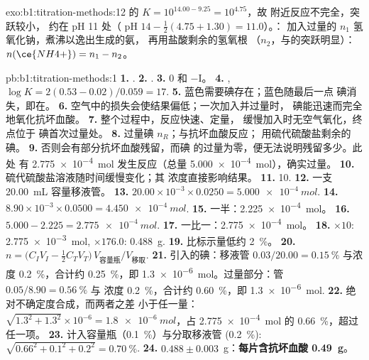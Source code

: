 \begin{solution}{exo:b1:titration-methods:12}
 的 $K = 10^{14.00 - 9.25} = 10^{4.75}$，故
附近反应不完全，突跃较小，
约在 pH 11 处（ pH $14 - \frac12(4.75 + 1.30) = 11.0$）。：
加入过量的 $n_1$ 氢氧化钠，煮沸以逸出生成的氨，
再用盐酸剩余的氢氧根
（$n_2$，与的突跃明显）：$n(\ce{NH4+}) = n_1 - n_2$。
\end{solution}

\begin{solution}{pb:b1:titration-methods:1}
\textbf{1.} .
\textbf{2.} .
\textbf{3.} 0 和 $-$I。
\textbf{4.} , $\log K = 2(0.53 - 0.02)/0.059
= 17$.
\textbf{5.} 蓝色需要碘存在；蓝色随最后一点
碘消失，即在。
\textbf{6.} 空气中的损失会使结果偏低；一次加入并过量时，
碘能迅速而完全地氧化抗坏血酸。
\textbf{7.} 整个过程中，反应快速、定量，
缓慢加入时无空气氧化，终点位于
碘首次过量处。
\textbf{8.} 过量碘 $n_R$；与抗坏血酸反应；
用硫代硫酸盐剩余的碘。
\textbf{9.} 否则会有部分抗坏血酸残留，而碘
的过量为零，便无法说明残留多少。此处
有 \qty{2.775e-4}{mol} 发生反应（总量 \qty{5.000e-4}{mol}），确实过量。
\textbf{10.} 硫代硫酸盐溶液随时间缓慢变化；其
浓度直接影响结果。
\textbf{11.} 10.
\textbf{12.} 一支 \qty{20.00}{mL} 容量移液管。
\textbf{13.} $20.00 \times 10^{-3} \times 0.0250 = \qty{5.000e-4}{mol}$.
\textbf{14.} $8.90 \times 10^{-3} \times 0.0500 = \qty{4.450e-4}{mol}$.
\textbf{15.} 一半：\qty{2.225e-4}{mol}。
\textbf{16.} $5.000 - 2.225 = \qty{2.775e-4}{mol}$.
\textbf{17.} 一比一：\qty{2.775e-4}{mol}。
\textbf{18.} $\times 10$: \qty{2.775e-3}{mol}, $\times 176.0$:
\qty{0.488}{g}.
\textbf{19.} 比标示量低约 \qty{2}{\percent}。
\textbf{20.} $n = \bigl(C_IV_I - \frac12C_TV_T\bigr)\,V_{\text{容量瓶}}/V_{\text{移取}}$.
\textbf{21.} 引入的碘：移液管 $0.03/20.00 = \qty{0.15}{\percent}$
与浓度 \qty{0.2}{\percent}，合计约 \qty{0.25}{\percent}，即
\qty{1.3e-6}{mol}。过量部分：管 $0.05/8.90 = \qty{0.56}{\percent}$ 与
浓度 \qty{0.2}{\percent}，合计约 \qty{0.60}{\percent}，即
\qty{1.3e-6}{mol}.
\textbf{22.} 绝对不确定度合成，而两者之差
小于任一量：$\sqrt{1.3^2 + 1.3^2} \times 10^{-6} =
\qty{1.8e-6}{mol}$，占 \qty{2.775e-4}{mol} 的 \qty{0.66}{\percent}，超过
任一项。
\textbf{23.} 计入容量瓶（\qty{0.1}{\percent}）与分取移液管
(\qty{0.2}{\percent}): $\sqrt{0.66^2 + 0.1^2 + 0.2^2} = \qty{0.70}{\percent}$.
\textbf{24.} $0.488 \pm 0.003$~g：\textbf{每片含抗坏血酸
\qty{0.49}{g}}。
\end{solution}
